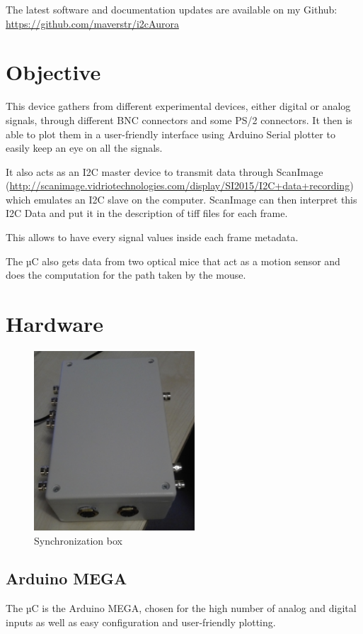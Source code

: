 \documentclass[a4paper]{article}
\begin{document}
The latest software and documentation updates are available on my Github: \url{https://github.com/maverstr/i2cAurora}

\section{Objective}
This device gathers from different experimental devices, either digital or analog signals, through different BNC connectors and some PS/2 connectors. 
It then is able to plot them in a user-friendly interface using Arduino Serial plotter to easily keep an eye on all the signals.

It also acts as an I2C master device to transmit data through ScanImage (\url{http://scanimage.vidriotechnologies.com/display/SI2015/I2C+data+recording}) which emulates an I2C slave on the computer.
ScanImage can then interpret this I2C Data and put it in the description of tiff files for each frame.

This allows to have every signal values inside each frame metadata.

The µC also gets data from two optical mice that act as a motion sensor and does the computation for the path taken by the mouse.

\section{Hardware}

\begin{figure}[h!]
    \centering
    \includegraphics[width = 6cm]{images/synchroBox.jpg}
    \caption{Synchronization box}
    \label{fig:synchroBox}
\end{figure}

\subsection{Arduino MEGA}
The µC is the Arduino MEGA, chosen for the high number of analog and digital inputs as well as easy configuration and user-friendly plotting.
\end{document}
